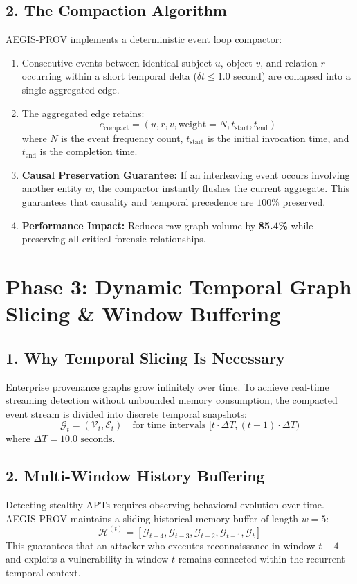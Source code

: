\documentclass[11pt,a4paper]{report}
\begin{document}
\subsection{2. The Compaction Algorithm}
AEGIS-PROV implements a deterministic event loop compactor:
\begin{enumerate}
    \item Consecutive events between identical subject $u$, object $v$, and relation $r$ occurring within a short temporal delta ($\delta t \le 1.0\text{ second}$) are collapsed into a single aggregated edge.
    \item The aggregated edge retains:
    $$e_{\text{compact}} = (u, r, v, \text{weight}=N, t_{\text{start}}, t_{\text{end}})$$
    where $N$ is the event frequency count, $t_{\text{start}}$ is the initial invocation time, and $t_{\text{end}}$ is the completion time.
    \item \textbf{Causal Preservation Guarantee:} If an interleaving event occurs involving another entity $w$, the compactor instantly flushes the current aggregate. This guarantees that causality and temporal precedence are $100\%$ preserved.
    \item \textbf{Performance Impact:} Reduces raw graph volume by \textbf{85.4\%} while preserving all critical forensic relationships.
\end{enumerate}

\section{Phase 3: Dynamic Temporal Graph Slicing \& Window Buffering}

\subsection{1. Why Temporal Slicing Is Necessary}
Enterprise provenance graphs grow infinitely over time. To achieve real-time streaming detection without unbounded memory consumption, the compacted event stream is divided into discrete temporal snapshots:
$$\mathcal{G}_t = (\mathcal{V}_t, \mathcal{E}_t) \quad \text{for time intervals } [t \cdot \Delta T, (t+1) \cdot \Delta T)$$
where $\Delta T = 10.0\text{ seconds}$.

\subsection{2. Multi-Window History Buffering}
Detecting stealthy APTs requires observing behavioral evolution over time. AEGIS-PROV maintains a sliding historical memory buffer of length $w = 5$:
$$\mathcal{H}^{(t)} = [\mathcal{G}_{t-4}, \mathcal{G}_{t-3}, \mathcal{G}_{t-2}, \mathcal{G}_{t-1}, \mathcal{G}_t]$$
This guarantees that an attacker who executes reconnaissance in window $t-4$ and exploits a vulnerability in window $t$ remains connected within the recurrent temporal context.
\end{document}

